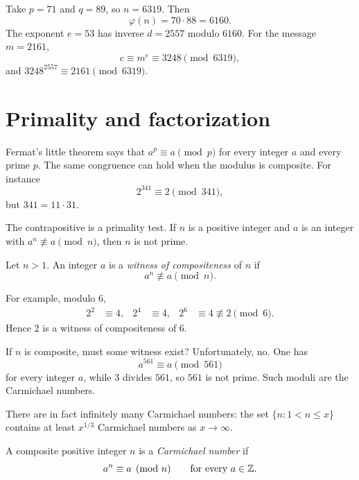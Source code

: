 \begin{example}
Take \(p=71\) and \(q=89\), so \(n=6319\). Then
\[
    \varphi(n)=70\cdot 88=6160.
\]
The exponent \(e=53\) has inverse \(d=2557\) modulo \(6160\). For the message \(m=2161\),
\[
    c\equiv m^{e}\equiv 3248\pmod{6319},
\]
and \(3248^{2557}\equiv 2161\pmod{6319}\).
\end{example}


\section{Primality and factorization}

Fermat's little theorem says that \(a^{p}\equiv a\pmod{p}\) for every integer \(a\) and every prime \(p\). The same congruence can hold when the modulus is composite. For instance
\[
    2^{341}\equiv 2\pmod{341},
\]
but \(341=11\cdot 31\).

The contrapositive is a primality test. If \(n\) is a positive integer and \(a\) is an integer with \(a^{n}\not\equiv a\pmod{n}\), then \(n\) is not prime.

\begin{definition}
Let \(n>1\). An integer \(a\) is a \emph{witness of compositeness} of \(n\) if
\[
    a^{n}\not\equiv a\pmod{n}.
\]
\end{definition}

For example, modulo \(6\),
\begin{align*}
    2^{2}&\equiv 4, &
    2^{4}&\equiv 4, &
    2^{6}&\equiv 4\not\equiv 2\pmod{6}.
\end{align*}
Hence \(2\) is a witness of compositeness of \(6\).

If \(n\) is composite, must some witness exist? Unfortunately, no. One has
\[
    a^{561}\equiv a\pmod{561}
\]
for every integer \(a\), while \(3\) divides \(561\), so \(561\) is not prime. Such moduli are the Carmichael numbers.


There are in fact infinitely many Carmichael numbers: the set \(\{n:1<n\le x\}\) contains at least \(x^{1/3}\) Carmichael numbers as \(x\to\infty\).

\begin{definition}
A composite positive integer \(n\) is a \emph{Carmichael number} if
\[
    a^{n}\equiv a\pmod{n}
    \qquad\text{for every }a\in\mathbb Z.
\]
\end{definition}

